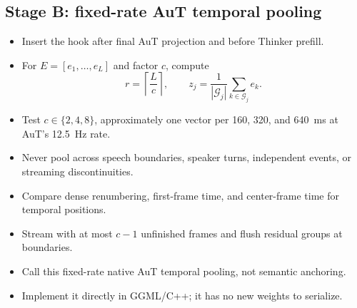 \documentclass[10pt,letterpaper]{article}
\begin{document}
\subsection{Stage B: fixed-rate AuT temporal pooling}
\begin{itemize}
    \item Insert the hook after final AuT projection and before Thinker prefill.
    \item For $E=[e_1,\ldots,e_L]$ and factor $c$, compute
    \[
    r=\left\lceil\frac{L}{c}\right\rceil,\qquad
    z_j=\frac{1}{|\mathcal G_j|}\sum_{k\in\mathcal G_j}e_k.
    \]
    \item Test $c\in\{2,4,8\}$, approximately one vector per 160, 320, and 640~ms at AuT's 12.5~Hz rate.
    \item Never pool across speech boundaries, speaker turns, independent events, or streaming discontinuities.
    \item Compare dense renumbering, first-frame time, and center-frame time for temporal positions.
    \item Stream with at most $c-1$ unfinished frames and flush residual groups at boundaries.
    \item Call this fixed-rate native AuT temporal pooling, not semantic anchoring.
    \item Implement it directly in GGML/C++; it has no new weights to serialize.
\end{itemize}
\end{document}
